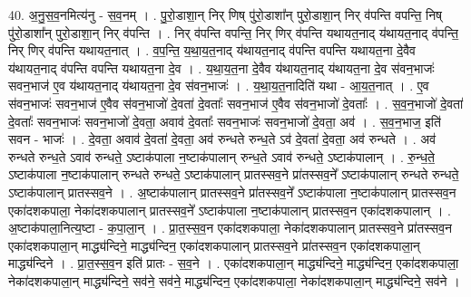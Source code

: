 \documentclass[17pt]{extarticle}
\begin{document}
40. अ॒नु॒स॒व॒नमित्य॑नु - स॒व॒नम् । . पु॒रो॒डाशा॒न् निर् णिष् पु॑रो॒डाशा᳚न् पुरो॒डाशा॒न् निर् व॑पन्ति वपन्ति॒ निष् पु॑रो॒डाशा᳚न् पुरो॒डाशा॒न् निर् व॑पन्ति । . निर् व॑पन्ति वपन्ति॒ निर् णिर् व॑पन्ति यथायत॒नाद् य॑थायत॒नाद् व॑पन्ति॒ निर् णिर् व॑पन्ति यथायत॒नात् । . व॒प॒न्ति॒ य॒था॒य॒त॒नाद् य॑थायत॒नाद् व॑पन्ति वपन्ति यथायत॒ना दे॒वैव य॑थायत॒नाद् व॑पन्ति वपन्ति यथायत॒ना दे॒व । . य॒था॒य॒त॒ना दे॒वैव य॑थायत॒नाद् य॑थायत॒ना दे॒व स॑वन॒भाजः॑ सवन॒भाज॑ ए॒व य॑थायत॒नाद् य॑थायत॒ना दे॒व स॑वन॒भाजः॑ । . य॒था॒य॒त॒नादिति॑ यथा - आ॒य॒त॒नात् । . ए॒व स॑वन॒भाजः॑ सवन॒भाज॑ ए॒वैव स॑वन॒भाजो॑ दे॒वता॑ दे॒वताः᳚ सवन॒भाज॑ ए॒वैव स॑वन॒भाजो॑ दे॒वताः᳚ । . स॒व॒न॒भाजो॑ दे॒वता॑ दे॒वताः᳚ सवन॒भाजः॑ सवन॒भाजो॑ दे॒वता॒ अवाव॑ दे॒वताः᳚ सवन॒भाजः॑ सवन॒भाजो॑ दे॒वता॒ अव॑ । . स॒व॒न॒भाज॒ इति॑ सवन - भाजः॑ । . दे॒वता॒ अवाव॑ दे॒वता॑ दे॒वता॒ अव॑ रुन्धते रुन्ध॒ते ऽव॑ दे॒वता॑ दे॒वता॒ अव॑ रुन्धते । . अव॑ रुन्धते रुन्ध॒ते ऽवाव॑ रुन्धते॒ ऽष्टाक॑पाला न॒ष्टाक॑पालान् रुन्ध॒ते ऽवाव॑ रुन्धते॒ ऽष्टाक॑पालान् । . रु॒न्ध॒ते॒ ऽष्टाक॑पाला न॒ष्टाक॑पालान् रुन्धते रुन्धते॒ ऽष्टाक॑पालान् प्रातस्सव॒ने प्रा॑तस्सव॒ने᳚ ऽष्टाक॑पालान् रुन्धते रुन्धते॒ ऽष्टाक॑पालान् प्रातस्सव॒ने । . अ॒ष्टाक॑पालान् प्रातस्सव॒ने प्रा॑तस्सव॒ने᳚ ऽष्टाक॑पाला न॒ष्टाक॑पालान् प्रातस्सव॒न एका॑दशकपाला॒ नेका॑दशकपालान् प्रातस्सव॒ने᳚ ऽष्टाक॑पाला न॒ष्टाक॑पालान् प्रातस्सव॒न एका॑दशकपालान् । . अ॒ष्टाक॑पाला॒नित्य॒ष्टा - क॒पा॒ला॒न् । . प्रा॒त॒स्स॒व॒न एका॑दशकपाला॒ नेका॑दशकपालान् प्रातस्सव॒ने प्रा॑तस्सव॒न एका॑दशकपाला॒न् माद्ध्य॑न्दिने॒ माद्ध्य॑न्दिन॒ एका॑दशकपालान् प्रातस्सव॒ने प्रा॑तस्सव॒न एका॑दशकपाला॒न् माद्ध्य॑न्दिने । . प्रा॒त॒स्स॒व॒न इति॑ प्रातः - स॒व॒ने । . एका॑दशकपाला॒न् माद्ध्य॑न्दिने॒ माद्ध्य॑न्दिन॒ एका॑दशकपाला॒ नेका॑दशकपाला॒न् माद्ध्य॑न्दिने॒ सव॑ने॒ सव॑ने॒ माद्ध्य॑न्दिन॒ एका॑दशकपाला॒ नेका॑दशकपाला॒न् माद्ध्य॑न्दिने॒ सव॑ने । \newline
\end{document}
